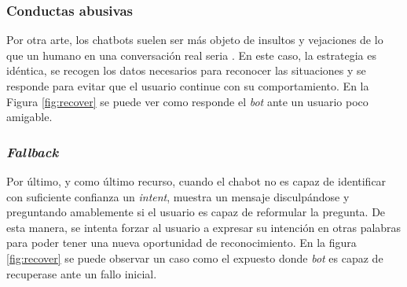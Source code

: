\subsubsection{Conductas abusivas}
Por otra arte, los chatbots suelen ser más objeto de insultos y vejaciones de lo que un humano en una conversación real seria \cite{shouldInteract}. En este caso, la estrategia es idéntica, se recogen los datos necesarios para reconocer las situaciones y se responde para evitar que el usuario continue con su comportamiento. En la Figura \ref{fig:recover} se puede ver como responde el \textit{bot} ante un usuario poco amigable.\\

\subsubsection{\textit{Fallback}}
Por último, y como último recurso, cuando el chabot no es capaz de identificar con suficiente confianza un \textit{intent}, muestra un mensaje disculpándose y preguntando amablemente si el usuario es capaz de reformular la pregunta. De esta manera, se intenta forzar al usuario a expresar su intención en otras palabras para poder tener una nueva oportunidad de reconocimiento. En la figura \ref{fig:recover} se puede observar un caso como el expuesto donde \textit{bot} es capaz de recuperase ante un fallo inicial.\\

